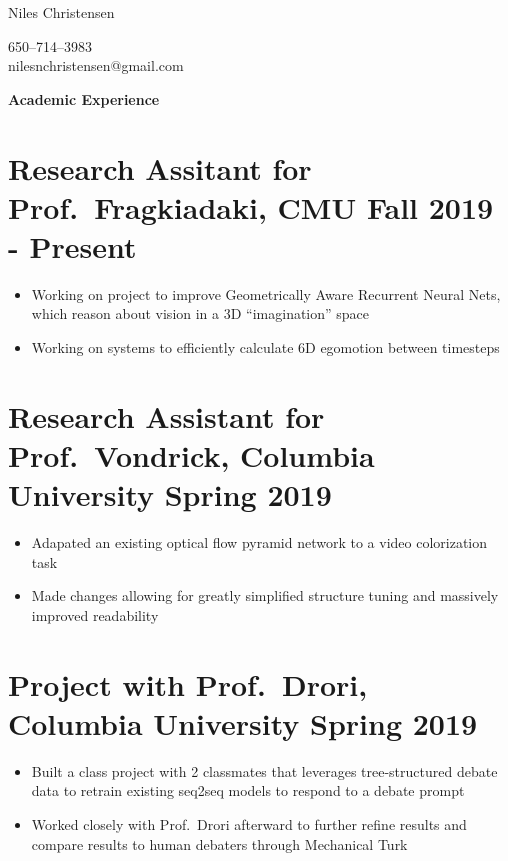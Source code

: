 \documentclass{article}
\newenvironment{tightcenter}{%
  \setlength\topsep{0pt}
  \setlength\parskip{0pt}
  \begin{center}
}{%
  \end{center}
}
\begin{document}
\begin{tightcenter}
\begin{Large}Niles Christensen\\
\end{Large}
\begin{small}
650--714--3983\\
nilesnchristensen@gmail.com
\end{small}
\end{tightcenter}

\noindent
\large{\textbf{Academic Experience}}

\section*{\textbf{Research Assitant for Prof.\ Fragkiadaki, CMU \hfill Fall 2019 - Present}}
\begin{itemize}[noitemsep]
  \item Working on project to improve Geometrically Aware Recurrent Neural Nets, which reason about vision in a 3D ``imagination'' space
  \item Working on systems to efficiently calculate 6D egomotion between timesteps
\end{itemize}

\section*{\textbf{Research Assistant for Prof.\ Vondrick, Columbia University \hfill	Spring 2019}}
\begin{itemize}[noitemsep]
    \item Adapated an existing optical flow pyramid network to a video colorization task
    \item Made changes allowing for greatly simplified structure tuning and massively improved readability
\end{itemize}

\section*{\textbf{Project with Prof.\ Drori, Columbia University \hfill Spring 2019}}
\begin{itemize}[noitemsep]
  \item Built a class project with 2 classmates that leverages tree-structured debate data to retrain existing seq2seq models to respond to a debate prompt
  \item Worked closely with Prof.\ Drori afterward to further refine results and compare results to human debaters through Mechanical Turk
\end{itemize}
\end{document}
